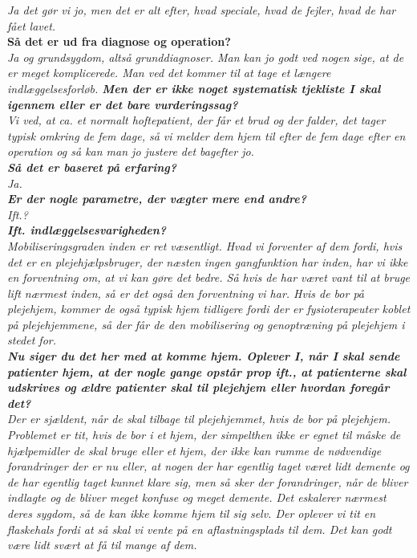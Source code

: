 \noindent
\textit{Ja det gør vi jo, men det er alt efter, hvad speciale, hvad de fejler, hvad de har fået lavet.}  \\
\noindent
\textbf{Så det er ud fra diagnose og operation?} \\
\noindent
\textit{Ja og grundsygdom, altså grunddiagnoser. Man kan jo godt ved nogen sige, at de er meget komplicerede. Man ved det kommer til at tage et længere indlæggelsesforløb.
\textbf{Men der er ikke noget systematisk tjekliste I skal igennem eller er det bare vurderingssag?} \\
\noindent
\textit{Vi ved, at ca. et normalt hoftepatient, der får et brud og der falder, det tager typisk omkring de fem dage, så vi melder dem hjem til efter de fem dage efter en operation og så kan man jo justere det bagefter jo.} \\
\noindent
\textbf{Så det er baseret på erfaring?} \\
\noindent
\textit{Ja.} \\
\noindent
\textbf{Er der nogle parametre, der vægter mere end andre? } \\
\noindent
\textit{Ift.?} \\
\noindent
\textbf{Ift. indlæggelsesvarigheden?} \\
\noindent
\textit{Mobiliseringsgraden inden er ret væsentligt. Hvad vi forventer af dem fordi, hvis det er en plejehjælpsbruger, der næsten ingen gangfunktion har inden, har vi ikke en forventning om, at vi kan gøre det bedre. Så hvis de har været vant til at bruge lift nærmest inden, så er det også den forventning vi har. Hvis de bor på plejehjem, kommer de også typisk hjem tidligere fordi der er fysioterapeuter koblet på plejehjemmene, så der får de den mobilisering og genoptræning på plejehjem i stedet for. } \\
\noindent
\textbf{Nu siger du det her med at komme hjem. Oplever I, når I skal sende patienter hjem, at der nogle gange opstår prop ift., at patienterne skal udskrives og ældre patienter skal til plejehjem eller hvordan foregår det? } \\
\noindent
\textit{Der er sjældent, når de skal tilbage til plejehjemmet, hvis de bor på plejehjem. Problemet er tit, hvis de bor i et hjem, der simpelthen ikke er egnet til måske de hjælpemidler de skal bruge eller et hjem, der ikke kan rumme de nødvendige forandringer der er nu eller, at nogen der har egentlig taget været lidt demente og de har egentlig taget kunnet klare sig, men så sker der forandringer, når de bliver indlagte og de bliver meget konfuse og meget demente. Det eskalerer nærmest deres sygdom, så de kan ikke komme hjem til sig selv. Der oplever vi tit en flaskehals fordi at så skal vi vente på en aflastningsplads til dem. Det kan godt være lidt svært at få til mange af dem.} \\
}
